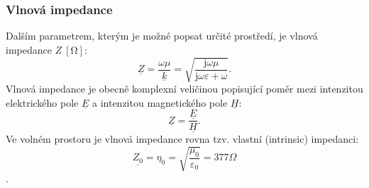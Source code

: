 \documentclass[12pt,a4paper,oneside]{article}
\numberwithin{equation}{section} %
\numberwithin{figure}{section} %
\numberwithin{table}{section} %
\newcommand{\mj}{\mathrm{j}} %
\newcommand{\faz}[1]{{\underline{#1}}} %
\begin{document}
\subsubsection*{Vlnová impedance}
Dalším parametrem, kterým je možné popsat určité prostředí, je vlnová impedance $Z ~\mathrm{[\Omega]}$:
\begin{equation}
\faz{Z} = \frac{\omega \mu}{\faz{k}} = \sqrt{\dfrac{\mj \omega \mu}{\mj \omega \varepsilon + \omega}} .
\end{equation}
Vlnová impedance je obecně komplexní veličinou popisující poměr mezi intenzitou elektrického pole $\faz{E}$ a intenzitou magnetického pole $\faz{H}$:
\begin{equation}
\faz{Z} = \frac{\faz{E}}{\faz{H}} .
\end{equation}
Ve volném prostoru je vlnová impedance rovna tzv. vlastní (intrinsic) impedanci:
\begin{equation}
\faz{Z_0} = \eta _0 = \sqrt{\dfrac{\mu _0}{\varepsilon _0}} = 377 \Omega
\end{equation}
\cite{Intrinsic} .
\end{document}
